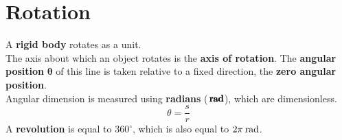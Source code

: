 \documentclass[../AP_Physics_C.tex]{subfiles}
\begin{document}
	\section{Rotation}
		A \textbf{rigid body} rotates as a unit. \\
		The axis about which an object rotates is the \textbf{axis of rotation}. The \textbf{angular position} $\pmb{\theta}$ of this line is taken relative to a fixed direction, the \textbf{zero angular position}. \\
		Angular dimension is measured using \textbf{radians} ($\pmb{\hspace{0.7mm}\mathrm{rad}}$), which are dimensionless.
		\[\theta = \frac{s}{r}\]
		A \textbf{revolution} is equal to $360^\circ$, which is also equal to $2\pi\hspace{0.7mm}\mathrm{rad}$.
\end{document}

